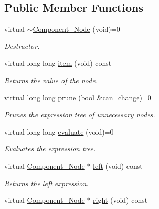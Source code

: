 \subsection*{Public Member Functions}
\begin{DoxyCompactItemize}
\item 
virtual \hyperlink{classMadara_1_1Expression__Tree_1_1Component__Node_ad3faf41112894db3ec94226e20629efb}{$\sim$Component\_\-Node} (void)=0
\begin{DoxyCompactList}\small\item\em Destructor. \item\end{DoxyCompactList}\item 
virtual long long \hyperlink{classMadara_1_1Expression__Tree_1_1Component__Node_ac38c35834da00a454c8f876278ad1b99}{item} (void) const 
\begin{DoxyCompactList}\small\item\em Returns the value of the node. \item\end{DoxyCompactList}\item 
virtual long long \hyperlink{classMadara_1_1Expression__Tree_1_1Component__Node_a8833adfc3e79980a90e82a68586f4300}{prune} (bool \&can\_\-change)=0
\begin{DoxyCompactList}\small\item\em Prunes the expression tree of unnecessary nodes. \item\end{DoxyCompactList}\item 
virtual long long \hyperlink{classMadara_1_1Expression__Tree_1_1Component__Node_a16c08750339b84c363e9fd0ea9858969}{evaluate} (void)=0
\begin{DoxyCompactList}\small\item\em Evaluates the expression tree. \item\end{DoxyCompactList}\item 
virtual \hyperlink{classMadara_1_1Expression__Tree_1_1Component__Node}{Component\_\-Node} $\ast$ \hyperlink{classMadara_1_1Expression__Tree_1_1Component__Node_abe0c7474f1af4cb06d06ab13479a89db}{left} (void) const 
\begin{DoxyCompactList}\small\item\em Returns the left expression. \item\end{DoxyCompactList}\item 
virtual \hyperlink{classMadara_1_1Expression__Tree_1_1Component__Node}{Component\_\-Node} $\ast$ \hyperlink{classMadara_1_1Expression__Tree_1_1Component__Node_a672f2b18b4e63efda38e9063a47bc30f}{right} (void) const 

\end{DoxyCompactItemize}
